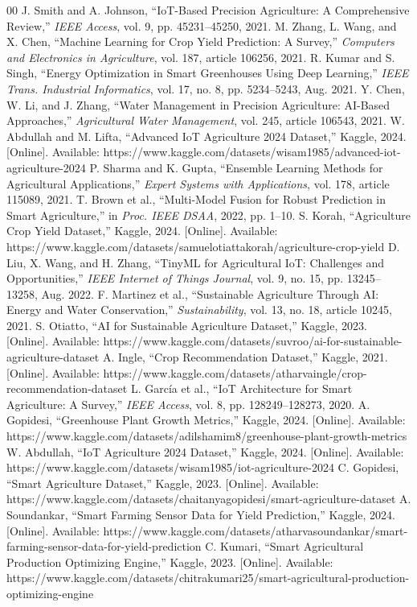 \documentclass[conference]{IEEEtran}
\begin{document}
\begin{thebibliography}{00}
 J. Smith and A. Johnson, ``IoT-Based Precision Agriculture: A Comprehensive Review,'' \textit{IEEE Access}, vol. 9, pp. 45231--45250, 2021.
 M. Zhang, L. Wang, and X. Chen, ``Machine Learning for Crop Yield Prediction: A Survey,'' \textit{Computers and Electronics in Agriculture}, vol. 187, article 106256, 2021.
 R. Kumar and S. Singh, ``Energy Optimization in Smart Greenhouses Using Deep Learning,'' \textit{IEEE Trans. Industrial Informatics}, vol. 17, no. 8, pp. 5234--5243, Aug. 2021.
 Y. Chen, W. Li, and J. Zhang, ``Water Management in Precision Agriculture: AI-Based Approaches,'' \textit{Agricultural Water Management}, vol. 245, article 106543, 2021.
 W. Abdullah and M. Lifta, ``Advanced IoT Agriculture 2024 Dataset,'' Kaggle, 2024. [Online]. Available: https://www.kaggle.com/datasets/wisam1985/advanced-iot-agriculture-2024
 P. Sharma and K. Gupta, ``Ensemble Learning Methods for Agricultural Applications,'' \textit{Expert Systems with Applications}, vol. 178, article 115089, 2021.
 T. Brown et al., ``Multi-Model Fusion for Robust Prediction in Smart Agriculture,'' in \textit{Proc. IEEE DSAA}, 2022, pp. 1--10.
 S. Korah, ``Agriculture Crop Yield Dataset,'' Kaggle, 2024. [Online]. Available: https://www.kaggle.com/datasets/samuelotiattakorah/agriculture-crop-yield
 D. Liu, X. Wang, and H. Zhang, ``TinyML for Agricultural IoT: Challenges and Opportunities,'' \textit{IEEE Internet of Things Journal}, vol. 9, no. 15, pp. 13245--13258, Aug. 2022.
 F. Martinez et al., ``Sustainable Agriculture Through AI: Energy and Water Conservation,'' \textit{Sustainability}, vol. 13, no. 18, article 10245, 2021.
 S. Otiatto, ``AI for Sustainable Agriculture Dataset,'' Kaggle, 2023. [Online]. Available: https://www.kaggle.com/datasets/suvroo/ai-for-sustainable-agriculture-dataset
 A. Ingle, ``Crop Recommendation Dataset,'' Kaggle, 2021. [Online]. Available: https://www.kaggle.com/datasets/atharvaingle/crop-recommendation-dataset
 L. García et al., ``IoT Architecture for Smart Agriculture: A Survey,'' \textit{IEEE Access}, vol. 8, pp. 128249--128273, 2020.
 A. Gopidesi, ``Greenhouse Plant Growth Metrics,'' Kaggle, 2024. [Online]. Available: https://www.kaggle.com/datasets/adilshamim8/greenhouse-plant-growth-metrics
 W. Abdullah, ``IoT Agriculture 2024 Dataset,'' Kaggle, 2024. [Online]. Available: https://www.kaggle.com/datasets/wisam1985/iot-agriculture-2024
 C. Gopidesi, ``Smart Agriculture Dataset,'' Kaggle, 2023. [Online]. Available: https://www.kaggle.com/datasets/chaitanyagopidesi/smart-agriculture-dataset
 A. Soundankar, ``Smart Farming Sensor Data for Yield Prediction,'' Kaggle, 2024. [Online]. Available: https://www.kaggle.com/datasets/atharvasoundankar/smart-farming-sensor-data-for-yield-prediction
 C. Kumari, ``Smart Agricultural Production Optimizing Engine,'' Kaggle, 2023. [Online]. Available: https://www.kaggle.com/datasets/chitrakumari25/smart-agricultural-production-optimizing-engine
\end{thebibliography}
\end{document}
